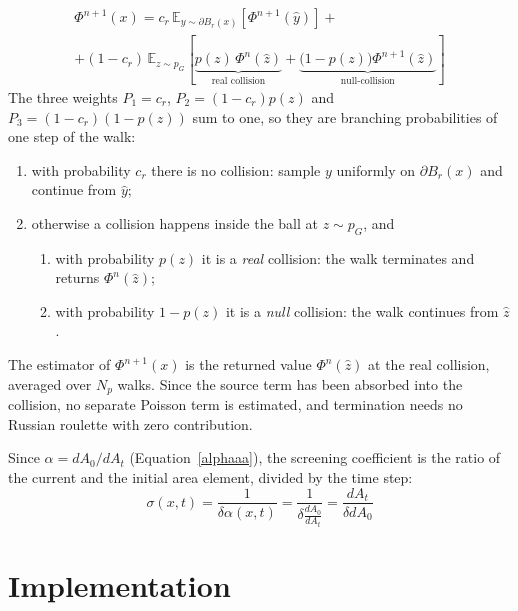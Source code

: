 \documentclass[
]{elteiktdk}[2024/04/26]
\begin{document}
	\begin{equation}
		\begin{gathered}
			\Phi^{n+1}(x)=c_r\,\mathbb{E}_{y \sim \partial B_r(x)}\!\left[\Phi^{n+1}(\hat{y})\right] + \\[6pt]
			+(1-c_r)\,\mathbb{E}_{z\sim p_G}\!\left[\underbrace{p(z)\,\Phi^{n}(\hat{z})}_{\text{real collision}}
			+\underbrace{\big(1-p(z)\big)\Phi^{n+1}(\hat{z})}_{\text{null-collision}}\right]
		\end{gathered}
	\end{equation}
	The three weights $P_1 = c_r$, $P_2 = (1-c_r)p(z)$ and
	$P_3 = (1-c_r)(1-p(z))$ sum to one, so they are branching probabilities of one step of the walk:
	\begin{enumerate}
		\item with probability $c_r$ there is no collision: sample $y$ uniformly on $\partial B_r(x)$
		and continue from $\hat{y}$;
		\item otherwise a collision happens inside the ball at $z\sim p_G$, and
		\begin{enumerate}
			\item with probability $p(z)$ it is a \emph{real} collision: the walk terminates and returns $\Phi^n(\hat{z})$;
			\item with probability $1-p(z)$ it is a \emph{null} collision: the walk continues from $\hat{z}$.
		\end{enumerate}
	\end{enumerate}
	The estimator of $\Phi^{n+1}(x)$ is the returned value $\Phi^n(\hat{z})$ at the
	real collision, averaged over $N_p$ walks. Since the source term has been absorbed into
	the collision, no separate Poisson term is estimated, and termination needs no Russian
	roulette with zero contribution.
	
	\begin{remark}
		Since $\alpha = dA_0/dA_t$ (Equation~\eqref{alphaaa}), the screening coefficient is the ratio of the current and the initial area element, divided by the time step:
		\begin{equation}
			\sigma(x,t) = \frac{1}{\delta\alpha(x,t)} = \frac{1}{\delta \frac{dA_0}{dA_t}} = \frac{dA_t}{\delta dA_0}
		\end{equation}
	\end{remark}

	\chapter{Implementation}
	\label{ch:impl}
	
\end{document}
